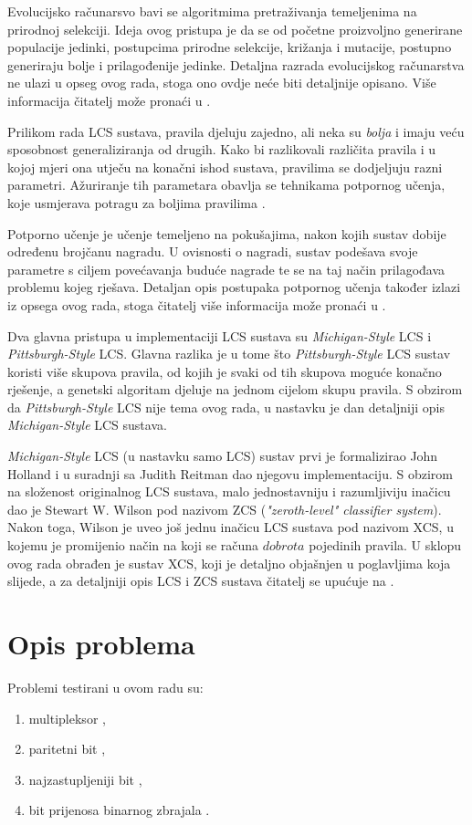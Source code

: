 \documentclass[times, utf8, zavrsni]{fer}
\begin{document}
Evolucijsko računarsvo bavi se algoritmima pretraživanja temeljenima na prirodnoj selekciji.
Ideja ovog pristupa je da se od početne proizvoljno generirane populacije jedinki, postupcima prirodne selekcije, križanja i mutacije, postupno generiraju bolje i prilagođenije jedinke.
Detaljna razrada evolucijskog računarstva ne ulazi u opseg ovog rada, stoga ono ovdje neće biti detaljnije opisano.
Više informacija čitatelj može pronaći u \citep{6}.

Prilikom rada LCS sustava, pravila djeluju zajedno, ali neka su \emph{bolja} i imaju veću sposobnost generaliziranja od drugih.
Kako bi razlikovali različita pravila i u kojoj mjeri ona utječu na konačni ishod sustava, pravilima se dodjeljuju razni parametri.
Ažuriranje tih parametara obavlja se tehnikama potpornog učenja, koje usmjerava potragu za boljima pravilima \citep{3}.

Potporno učenje je učenje temeljeno na pokušajima, nakon kojih sustav dobije određenu brojčanu nagradu.
U ovisnosti o nagradi, sustav podešava svoje parametre s ciljem povećavanja buduće nagrade te se na taj način prilagođava problemu kojeg rješava.
Detaljan opis postupaka potpornog učenja također izlazi iz opsega ovog rada, stoga čitatelj više informacija može pronaći u \citep{7}.

Dva glavna pristupa u implementaciji LCS sustava su \emph{Michigan-Style} LCS i \emph{Pittsburgh-Style} LCS.
Glavna razlika je u tome što \emph{Pittsburgh-Style} LCS sustav koristi više skupova pravila, od kojih je svaki od tih skupova moguće konačno rješenje, a genetski algoritam djeluje na jednom cijelom skupu pravila. S obzirom da \emph{Pittsburgh-Style} LCS nije tema ovog rada, u nastavku je dan detaljniji opis \emph{Michigan-Style} LCS sustava.

\emph{Michigan-Style} LCS (u nastavku samo LCS) sustav prvi je formalizirao John Holland i u suradnji sa Judith Reitman dao njegovu implementaciju.
S obzirom na složenost originalnog LCS sustava, malo jednostavniju i razumljiviju inačicu dao je Stewart W. Wilson pod nazivom ZCS (\emph{"zeroth-level" classifier system}).
Nakon toga, Wilson je uveo još jednu inačicu LCS sustava pod nazivom XCS, u kojemu je promijenio način na koji se računa $dobrota$ pojedinih pravila.
U sklopu ovog rada obrađen je sustav XCS, koji je detaljno objašnjen u poglavljima koja slijede, a za detaljniji opis LCS i ZCS sustava čitatelj se upućuje na \citep{3}.

\chapter{Opis problema}
Problemi testirani u ovom radu su:
\begin{enumerate}
    \item multipleksor ,
    \item paritetni bit ,
    \item najzastupljeniji bit ,
    \item bit prijenosa binarnog zbrajala .
\end{enumerate}
\end{document}
